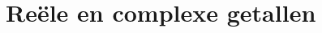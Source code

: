 \documentclass[main.tex]{subfiles}
\begin{document}
\chapter{Re\"ele en complexe getallen}
\label{cha:reele-en-complexe-getallen}
\end{document}
